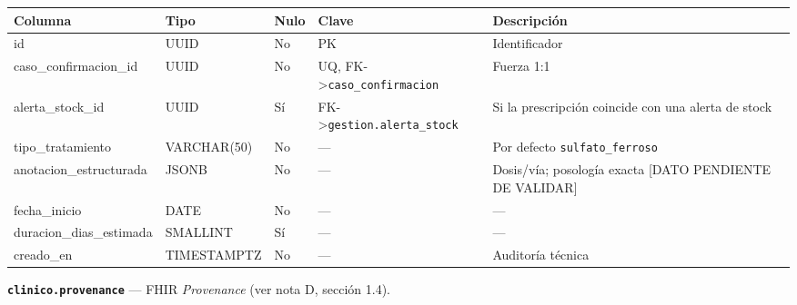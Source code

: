 \documentclass[11pt,a4paper]{article}
\begin{document}
{\small
\begin{longtable}[]{@{}
  >{\raggedright\arraybackslash}p{}
  >{\raggedright\arraybackslash}p{}
  >{\raggedright\arraybackslash}p{}
  >{\raggedright\arraybackslash}p{}
  >{\raggedright\arraybackslash}p{}@{}}
\toprule\noalign{}
\begin{minipage}[b]{\linewidth}\raggedright
Columna
\end{minipage} & \begin{minipage}[b]{\linewidth}\raggedright
Tipo
\end{minipage} & \begin{minipage}[b]{\linewidth}\raggedright
Nulo
\end{minipage} & \begin{minipage}[b]{\linewidth}\raggedright
Clave
\end{minipage} & \begin{minipage}[b]{\linewidth}\raggedright
Descripción
\end{minipage} \\
\midrule\noalign{}
\endhead
\bottomrule\noalign{}
\endlastfoot
id & UUID & No & PK & Identificador \\
caso\_confirmacion\_id & UUID & No & UQ, FK-\textgreater{}\texttt{caso\_confirmacion} & Fuerza 1:1 \\
alerta\_stock\_id & UUID & Sí & FK-\textgreater{}\texttt{gestion.alerta\_stock} & Si la prescripción coincide con una alerta de stock \\
tipo\_tratamiento & VARCHAR(50) & No & --- & Por defecto \texttt{sulfato\_ferroso} \\
anotacion\_estructurada & JSONB & No & --- & Dosis/vía; posología exacta {[}DATO PENDIENTE DE VALIDAR{]} \\
fecha\_inicio & DATE & No & --- & --- \\
duracion\_dias\_estimada & SMALLINT & Sí & --- & --- \\
creado\_en & TIMESTAMPTZ & No & --- & Auditoría técnica \\
\end{longtable}
}

\textbf{\texttt{clinico.provenance}} --- FHIR \emph{Provenance} (ver nota D, sección 1.4).
\end{document}
